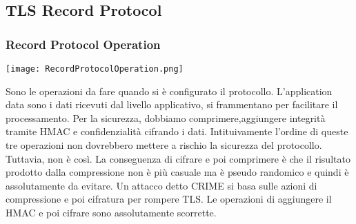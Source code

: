 \documentclass{article}
\theoremstyle{remark}
\begin{document}
\subsection{TLS Record Protocol}
\subsubsection{Record Protocol Operation}
\begin{center}
    \texttt{[image: RecordProtocolOperation.png]}
\end{center}
Sono le operazioni da fare quando si è configurato il protocollo.
L'application data sono i dati ricevuti dal livello applicativo, si frammentano per facilitare il processamento. Per la sicurezza, dobbiamo comprimere,aggiungere integrità tramite HMAC e confidenzialità cifrando i dati. Intituivamente l'ordine di queste tre operazioni non dovrebbero mettere a rischio la sicurezza del protocollo. Tuttavia, non è così.\newline
La conseguenza di cifrare e poi comprimere è che il risultato prodotto dalla compressione non è più casuale ma è pseudo randomico e quindi è assolutamente da evitare. Un attacco detto CRIME si basa sulle azioni di compressione e poi cifratura per rompere TLS.\newline
Le operazioni di aggiungere il HMAC e poi cifrare sono assolutamente scorrette.
\newpage
\end{document}
